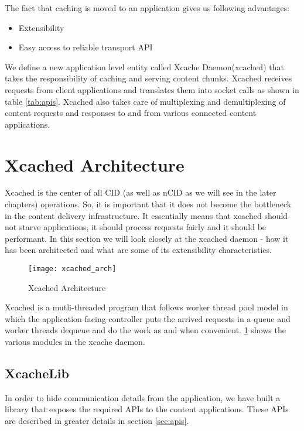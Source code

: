 The fact that caching is moved to an application gives us following
advantages:
\begin{itemize}
\item{Extensibility}
\item{Easy access to reliable transport API}
\end{itemize}

We define a new application level entity called Xcache Daemon(xcached)
that takes the responsibility of caching and serving content chunks.
Xcached receives requests from client applications and translates them
into socket calls as shown in table \ref{tab:apis}. Xcached also takes
care of multiplexing and demultiplexing of content requests and
responses to and from various connected content applications.

\section{Xcached Architecture}

Xcached is the center of all CID (as well as nCID as we will see in
the later chapters) operations. So, it is important that it does not
become the bottleneck in the content delivery infrastructure. It
essentially means that xcached should not starve applications, it
should process requests fairly and it should be performant. In this
section we will look closely at the xcached daemon - how it has been
architected and what are some of its extensibility characteristics.

\begin{figure}
  \begin{center}
    \texttt{[image: xcached\_arch]}
    \caption{Xcached Architecture}
    \label{fig:xcached_arch}
  \end{center}
\end{figure}
Xcached is a mutli-threaded program that follows worker thread pool
model in which the application facing controller puts the arrived
requests in a queue and worker threads dequeue and do the work as and
when convenient. \ref{fig:xcached_arch} shows the various modules in
the xcache daemon.

\subsection{XcacheLib}
In order to hide communication details from the application, we have
built a library that exposes the required APIs to the content
applications. These APIs are described in greater details in section
\ref{sec:apis}.

